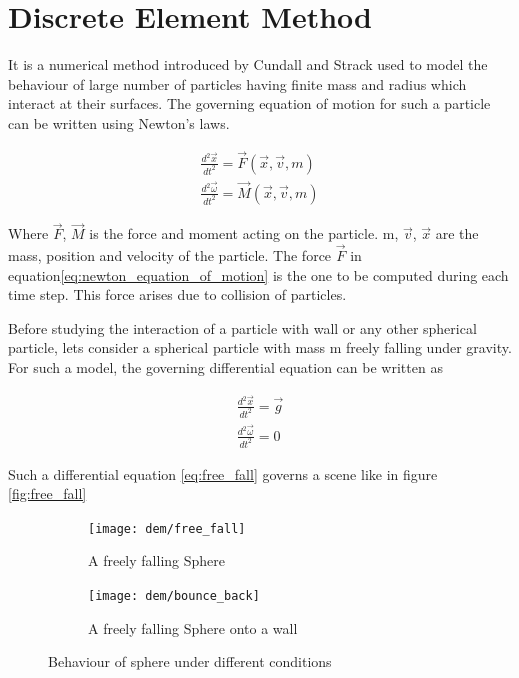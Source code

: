 \chapter{Discrete Element Method}

It is a numerical method introduced by Cundall and Strack \citep{CS79}
used to model the behaviour of large number of particles having finite
mass and radius which interact at their surfaces. The governing
equation of motion for such a particle can be written using Newton's
laws.

\begin{align}
  \label{eq:newton_equation_of_motion}
  \frac{d^2 \vec{x}}{dt^2} = \vec{F}(\vec{x}, \vec{v}, m)\\
  \frac{d^2 \vec{\omega}}{dt^2} = \vec{M}(\vec{x}, \vec{v}, m)
\end{align}

Where $\vec{F}$, $\vec{M}$ is the force and moment acting on the
particle. m, $\vec{v}$, $\vec{x}$ are the mass, position and velocity
of the particle.
The force $\vec{F}$ in equation\ref{eq:newton_equation_of_motion} is
the one to be computed during each time step. This force arises due to
collision of particles.


Before studying the interaction of a particle with wall or any other
spherical particle, lets consider a spherical particle with mass m
freely falling under gravity. For such a model, the governing
differential equation can be written as

\begin{align}
  \label{eq:free_fall}
  \frac{d^2 \vec{x}}{dt^2} = \vec{g}\\
  \frac{d^2 \vec{\omega}}{dt^2} = 0
\end{align}

Such a differential equation \eqref{eq:free_fall} governs a scene like
in figure \eqref{fig:free_fall}

\begin{figure}
\centering
\begin{subfigure}{.5\textwidth}
  \centering
  \texttt{[image: dem/free\_fall]}
  \caption{A freely falling Sphere}
  \label{fig:free_fall}
\end{subfigure}%
\begin{subfigure}{.5\textwidth}
  \centering
  \texttt{[image: dem/bounce\_back]}
  \caption{A freely falling Sphere onto a wall}
  \label{fig:bounce_back}
\end{subfigure}
\caption{Behaviour of sphere under different conditions}
\label{fig:sphere_intro}
\end{figure}


